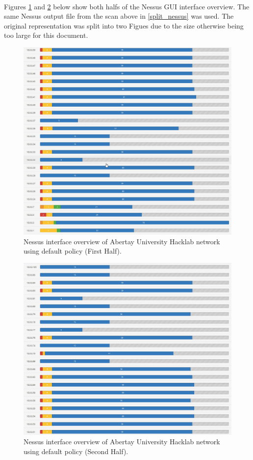 \paragraph{}Figures \ref{hacklab_nessus1} and \ref{hacklab_nessus2} below show both halfs of the Nessus GUI interface overview. The same Nessus output file from the scan above in \ref{split_nessus} was used. The original representation was split into two Figues due to the size otherwise being too large for this document.
\begin{figure}[!h]
\centering
\includegraphics[width=6.5in]{./Figures/hacklab_nessus1.png}
\caption{Nessus interface overview of Abertay University Hacklab network using default policy (First Half).}
\label{hacklab_nessus1}
\end{figure}
\begin{figure}[!h]
\centering
\includegraphics[width=6.5in]{./Figures/hacklab_nessus2.png}
\caption{Nessus interface overview of Abertay University Hacklab network using default policy (Second Half).}
\label{hacklab_nessus2}
\end{figure}


